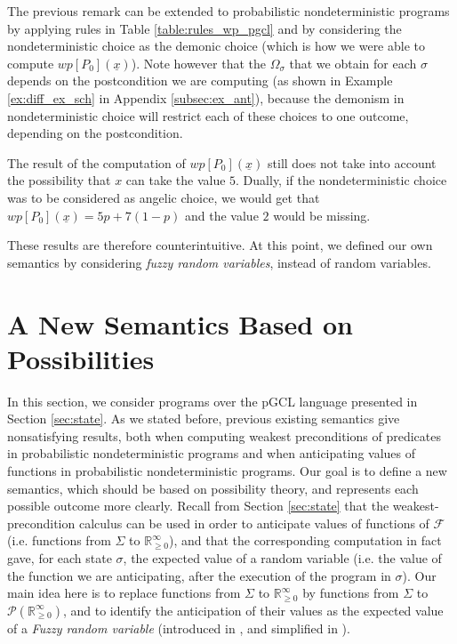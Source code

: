 \documentclass[a4paper,10pt]{llncs}
\def\RRposi {{\mathbb R_{\geq 0}^{\infty}}}
\begin{document}
\begin{remark}
The previous remark can be extended to probabilistic nondeterministic programs by applying rules in Table \ref{table:rules_wp_pgcl} and by considering the nondeterministic choice as the demonic choice (which is how we were able to compute $wp[P_0](\underline{x})$). Note however that the $\Omega_\sigma$ that we obtain for each $\sigma$ depends on the postcondition we are computing (as shown in Example \ref{ex:diff_ex_sch} in Appendix \ref{subsec:ex_ant}), because the demonism in nondeterministic choice will restrict each of these choices to one outcome, depending on the postcondition.
\end{remark}
\begin{remark}
The result of the computation of $wp[P_0](\underline{x})$ still does not take into account the possibility that $x$ can take the value $5$.
Dually, if the nondeterministic choice was to be considered as angelic choice, we would get that $wp[P_0](\underline{x}) = 5p+7(1-p)$ and the value $2$ would be missing.
\end{remark}

These results are therefore counterintuitive. At this point, we defined our own semantics by considering \emph{fuzzy random variables}, instead of random variables.
	

\section{A New Semantics Based on Possibilities}
\label{sec:contribution}

In this section, we consider programs over the pGCL language presented in Section \ref{sec:state}. As we stated before, previous existing semantics give nonsatisfying results, both when computing weakest preconditions of predicates in probabilistic nondeterministic programs and when anticipating values of functions in probabilistic nondeterministic programs. Our goal is to define a new semantics, which should be based on possibility theory, and represents each possible outcome more clearly.  Recall from Section \ref{sec:state} that the weakest-precondition calculus can be used in order to anticipate values of functions of $\mathcal{F}$ (i.e. functions from $\Sigma$ to $\RRposi$), and that the corresponding computation in fact gave, for each state $\sigma$, the expected value of a random variable (i.e. the value of the function we are anticipating, after the execution of the program in $\sigma$). Our main idea here is to replace functions from $\Sigma$ to $\RRposi$ by functions from $\Sigma$ to $\mathcal{P}(\RRposi)$, and to identify the anticipation of their values as the expected value of a \textit{Fuzzy random variable} (introduced in \cite{PuriRal86}, and simplified in \cite{Shapiro09}).
\end{document}
